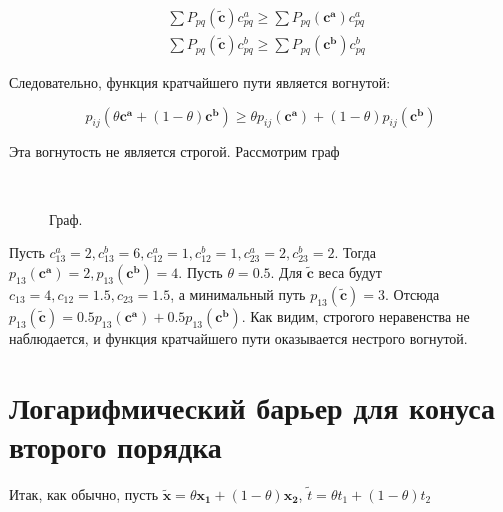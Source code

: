	\begin{equation}
	\begin{split}
	&\sum P_{pq}(\mathbf{\tilde{c}}) c_{pq}^a \geqslant \sum P_{pq}(\mathbf{c^a}) c_{pq}^a \\
	&\sum P_{pq}(\mathbf{\tilde{c}}) c_{pq}^b \geqslant \sum P_{pq}(\mathbf{c^b}) c_{pq}^b
	\end{split}
	\end{equation}	
	
	Следовательно, функция кратчайшего пути является вогнутой:
	
	\begin{equation}
	p_{ij}(\theta \mathbf{c^a} + (1 - \theta) \mathbf{c^b}) \geqslant \theta p_{ij}( \mathbf{c^a}) + (1-\theta ) p_{ij}( \mathbf{c^b}) 
	\end{equation}
	
	Эта вогнутость не является строгой. Рассмотрим граф
	
	\begin{figure}[H]
		\\
		\caption{Граф.}
	\end{figure}
	
	Пусть $c_{13}^a = 2, c_{13}^b = 6, c_{12}^a = 1, c_{12}^b = 1, c_{23}^a = 2, c_{23}^b = 2$. Тогда $p_{13}(\mathbf{c^a}) = 2, p_{13}(\mathbf{c^b}) = 4$. Пусть $\theta = 0.5$. Для $\mathbf{\tilde{c}}$ веса будут $c_{13} = 4, c_{12} = 1.5, c_{23} = 1.5$, а минимальный путь $p_{13}(\mathbf{\tilde{c}}) = 3$. Отсюда $p_{13}(\mathbf{\tilde{c}}) = 0.5 p_{13}(\mathbf{c^a}) + 0.5 p_{13}(\mathbf{c^b}) $. Как видим, строгого неравенства не наблюдается, и функция кратчайшего пути оказывается нестрого вогнутой.
	
	\section{Логарифмический барьер для конуса второго порядка}
	
	Итак, как обычно, пусть $\mathbf{\tilde{x}} = \theta \mathbf{x_1} +  (1 - \theta) \mathbf{x_2}$, $\tilde{t} = \theta t_1 + (1 - \theta) t_2$
	
